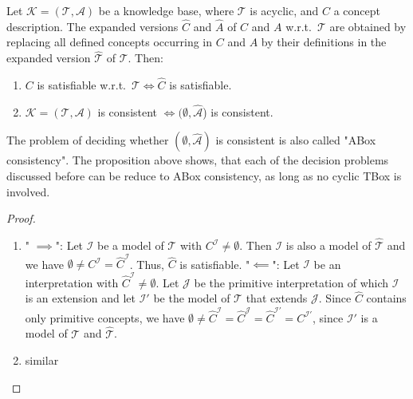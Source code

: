 \begin{prop}
Let  $\mathcal{K} = (\mathcal{T}, \mathcal{A})$ be a knowledge base, where $\mathcal{T}$ is acyclic, and $C$ a concept description.
The expanded versions $\widehat{C}$ and $\widehat{A}$ of $C$ and $A$ w.r.t.\ $\mathcal{T}$ are obtained by
replacing all defined concepts occurring in $C$ and $A$ by their definitions in the expanded version $\widehat{\mathcal{T}}$ of $\mathcal{T}$.
Then:
	\begin{enumerate}
		\item $C$ is satisfiable w.r.t.\ $\mathcal{T} \iff \widehat{C}$ is satisfiable.
		\item $\mathcal{K} = (\mathcal{T},\mathcal{A})$ is consistent $\iff (\emptyset,\widehat{\mathcal{A}}$) is consistent.
	\end{enumerate}
\end{prop}
\begin{merke}[frametitle=Important Note:]
	The problem of deciding whether $(\emptyset, \widehat{\mathcal{A}})$ is consistent is also called "ABox consistency".
	The proposition above shows, that each of the decision problems discussed before can be reduce to ABox consistency,
	as long as no cyclic TBox is involved.
\end{merke}
\begin{proof}
	\begin{enumerate}
		\item " $\implies$":\newline
			Let $\mathcal{I}$ be a model of $\mathcal{T}$ with $C^\mathcal{I} \neq \emptyset$.
			Then $\mathcal{I}$ is also a model of $\widehat{\mathcal{T}}$ and we have $\emptyset \neq C^\mathcal{I} = \widehat{C}^\mathcal{I}$.
			Thus, $\widehat{C}$ is satisfiable. \newline
			"$\impliedby$": \newline
			Let $\mathcal{I}$ be an interpretation with $\widehat{C}^{\mathcal{I}} \neq \emptyset$.
			Let $\mathcal{J}$ be the primitive interpretation of which $\mathcal{I}$ is an extension
			and let $\mathcal{I}'$ be the model of $\mathcal{T}$ that extends $\mathcal{J}$.
			Since $\widehat{C}$ contains only primitive concepts,
			we have $\emptyset \neq \widehat{C}^{\mathcal{I}} = \widehat{C}^\mathcal{J} = \widehat{C}^{\mathcal{I'}} = C^{\mathcal{I'}}$,
			since $\mathcal{I}'$ is a model of $\mathcal{T}$ and $\widehat{\mathcal{T}}$.
		\item similar
			\qedhere
	\end{enumerate}
\end{proof}
\newpage
